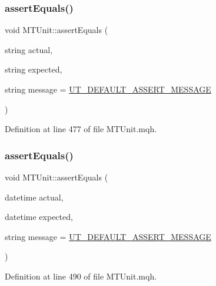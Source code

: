 \subsubsection{\texorpdfstring{assert\+Equals()}{assertEquals()}\hspace{0.1cm}{\footnotesize\ttfamily [12/28]}}
{\footnotesize\ttfamily void M\+T\+Unit\+::assert\+Equals (\begin{DoxyParamCaption}\item[{string}]{actual,  }\item[{string}]{expected,  }\item[{string}]{message = {\ttfamily \mbox{\hyperlink{_m_t_unit_8mqh_a96f5d62188d09039ebc3f443c9120e39}{U\+T\+\_\+\+D\+E\+F\+A\+U\+L\+T\+\_\+\+A\+S\+S\+E\+R\+T\+\_\+\+M\+E\+S\+S\+A\+GE}}} }\end{DoxyParamCaption})}



Definition at line 477 of file M\+T\+Unit.\+mqh.

\mbox{\label{class_m_t_unit_aa6144c96b64b7023fd40cc28c36b4fdb}} 
\subsubsection{\texorpdfstring{assert\+Equals()}{assertEquals()}\hspace{0.1cm}{\footnotesize\ttfamily [13/28]}}
{\footnotesize\ttfamily void M\+T\+Unit\+::assert\+Equals (\begin{DoxyParamCaption}\item[{datetime}]{actual,  }\item[{datetime}]{expected,  }\item[{string}]{message = {\ttfamily \mbox{\hyperlink{_m_t_unit_8mqh_a96f5d62188d09039ebc3f443c9120e39}{U\+T\+\_\+\+D\+E\+F\+A\+U\+L\+T\+\_\+\+A\+S\+S\+E\+R\+T\+\_\+\+M\+E\+S\+S\+A\+GE}}} }\end{DoxyParamCaption})}



Definition at line 490 of file M\+T\+Unit.\+mqh.

\mbox{\label{class_m_t_unit_a7307f24c9947d9197de4a57fddac5f03}} 
